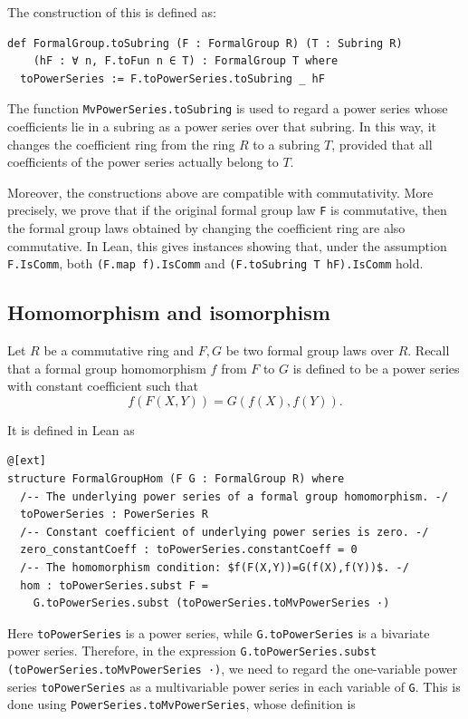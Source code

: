 The construction of this is defined as:

\begin{lstlisting}
def FormalGroup.toSubring (F : FormalGroup R) (T : Subring R)
    (hF : ∀ n, F.toFun n ∈ T) : FormalGroup T where
  toPowerSeries := F.toPowerSeries.toSubring _ hF
\end{lstlisting}

The function \lstinline|MvPowerSeries.toSubring|
\href{https://leanprover-community.github.io/mathlib4_docs/Mathlib/RingTheory/MvPowerSeries/Basic.html#MvPowerSeries.toSubring}{\faExternalLink}
is used to regard a power
series whose coefficients lie in a subring as a power series over that
subring.  In this way, it changes the coefficient ring from the
ring $R$ to a subring $T$, provided that all coefficients of the power
series actually belong to $T$.

Moreover, the constructions above are compatible with commutativity.
More precisely, we prove that if the original formal group law
\lstinline|F| is commutative, then the formal group laws obtained by
changing the coefficient ring are also commutative.  In Lean, this gives
instances showing that, under the assumption \lstinline|F.IsComm|, both
\lstinline|(F.map f).IsComm| and \lstinline|(F.toSubring T hF).IsComm|
hold.

\subsection{Homomorphism and isomorphism}

Let $R$ be a commutative ring and $F,G$ be two formal group laws over $R$.
Recall that a formal group homomorphism $f$ from $F$ to $G$ is defined to be
a power series with constant coefficient such that
\[f (F(X,Y)) = G(f(X), f(Y)). \]

It is defined in Lean as

\begin{lstlisting}
@[ext]
structure FormalGroupHom (F G : FormalGroup R) where
  /-- The underlying power series of a formal group homomorphism. -/
  toPowerSeries : PowerSeries R
  /-- Constant coefficient of underlying power series is zero. -/
  zero_constantCoeff : toPowerSeries.constantCoeff = 0
  /-- The homomorphism condition: $f(F(X,Y))=G(f(X),f(Y))$. -/
  hom : toPowerSeries.subst F =
    G.toPowerSeries.subst (toPowerSeries.toMvPowerSeries ·)
\end{lstlisting}

Here \lstinline|toPowerSeries| is a power series, while
\lstinline|G.toPowerSeries| is a bivariate power series.  Therefore,
in the expression
\lstinline|G.toPowerSeries.subst (toPowerSeries.toMvPowerSeries ·)|, we
need to regard the one-variable power series \lstinline|toPowerSeries| as
a multivariable power series in each variable of \lstinline|G|.
This is done using \lstinline|PowerSeries.toMvPowerSeries|, whose
definition is

